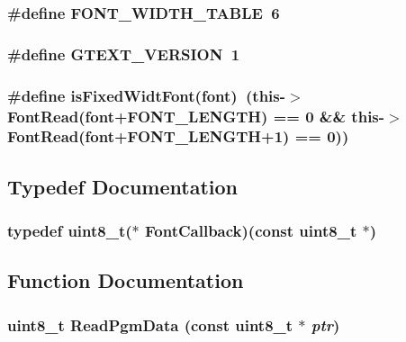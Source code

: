 \label{g_text-1_8h_ae06dc7b9804bb102859f0e32754e79a5}
\hypertarget{g_text-1_8h_ae6bf0901cff58e47324da9487d0ee938}{
\subsubsection[{FONT\_\-WIDTH\_\-TABLE}]{\setlength{\rightskip}{0pt plus 5cm}\#define FONT\_\-WIDTH\_\-TABLE~6}}
\label{g_text-1_8h_ae6bf0901cff58e47324da9487d0ee938}
\hypertarget{g_text-1_8h_abc8b7a6d70f9533c94c8bf3e9291412a}{
\subsubsection[{GTEXT\_\-VERSION}]{\setlength{\rightskip}{0pt plus 5cm}\#define GTEXT\_\-VERSION~1}}
\label{g_text-1_8h_abc8b7a6d70f9533c94c8bf3e9291412a}
\hypertarget{g_text-1_8h_ae32f2f70c6fb954fc54e063f26cc634e}{
\subsubsection[{isFixedWidtFont}]{\setlength{\rightskip}{0pt plus 5cm}\#define isFixedWidtFont(font)~(this-\/$>$FontRead(font+FONT\_\-LENGTH) == 0 \&\& this-\/$>$FontRead(font+FONT\_\-LENGTH+1) == 0))}}
\label{g_text-1_8h_ae32f2f70c6fb954fc54e063f26cc634e}


\subsection{Typedef Documentation}
\hypertarget{g_text-1_8h_ae36b3e52a6e5d20201ff5edf725c0fbd}{
\subsubsection[{FontCallback}]{\setlength{\rightskip}{0pt plus 5cm}typedef uint8\_\-t($\ast$ {\bf FontCallback})(const uint8\_\-t $\ast$)}}
\label{g_text-1_8h_ae36b3e52a6e5d20201ff5edf725c0fbd}


\subsection{Function Documentation}
\hypertarget{g_text-1_8h_a64d487f987b8914d5eb283e3a56e13ca}{
\subsubsection[{ReadPgmData}]{\setlength{\rightskip}{0pt plus 5cm}uint8\_\-t ReadPgmData (const uint8\_\-t $\ast$ {\em ptr})}}
\label{g_text-1_8h_a64d487f987b8914d5eb283e3a56e13ca}
